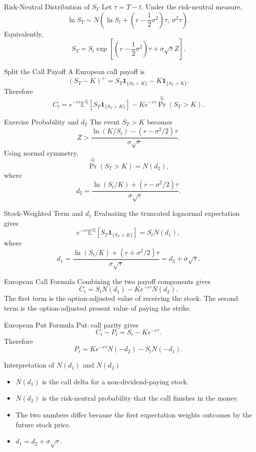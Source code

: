 \documentclass[aspectratio=169]{beamer}
\newcommand{\E}{\mathbb{E}}
\begin{document}
\begin{frame}[t]{Risk-Neutral Distribution of $S_T$}
\justifying
Let $\tau=T-t$. Under the risk-neutral measure,
\[\ln S_T\sim N\left(\ln S_t+\left(r-\frac12\sigma^2\right)\tau,\ \sigma^2\tau\right).\]
Equivalently,
\[S_T=S_t\exp\left[\left(r-\frac12\sigma^2\right)\tau+\sigma\sqrt\tau Z\right].\]
\end{frame}

\begin{frame}[t]{Split the Call Payoff}
\justifying
A European call payoff is
\[(S_T-K)^+=S_T\mathbf 1_{\{S_T>K\}}-K\mathbf 1_{\{S_T>K\}}.\]
Therefore
\[C_t=e^{-r\tau}\E^{\mathbb Q}[S_T\mathbf 1_{\{S_T>K\}}]-Ke^{-r\tau}\Pr^{\mathbb Q}(S_T>K).\]
\end{frame}

\begin{frame}[t]{Exercise Probability and $d_2$}
\justifying
The event $S_T>K$ becomes
\[Z>\frac{\ln(K/S_t)-(r-\sigma^2/2)\tau}{\sigma\sqrt\tau}.\]
Using normal symmetry,
\[\Pr^{\mathbb Q}(S_T>K)=N(d_2),\]
where
\[d_2=\frac{\ln(S_t/K)+(r-\sigma^2/2)\tau}{\sigma\sqrt\tau}.\]
\end{frame}

\begin{frame}[t]{Stock-Weighted Term and $d_1$}
\justifying
Evaluating the truncated lognormal expectation gives
\[e^{-r\tau}\E^{\mathbb Q}[S_T\mathbf 1_{\{S_T>K\}}]=S_tN(d_1),\]
where
\[d_1=\frac{\ln(S_t/K)+(r+\sigma^2/2)\tau}{\sigma\sqrt\tau}=d_2+\sigma\sqrt\tau.\]
\end{frame}

\begin{frame}[t]{European Call Formula}
\justifying
Combining the two payoff components gives
\[\boxed{C_t=S_tN(d_1)-Ke^{-r\tau}N(d_2)}.\]
The first term is the option-adjusted value of receiving the stock. The second term is the option-adjusted present value of paying the strike.
\end{frame}

\begin{frame}[t]{European Put Formula}
\justifying
Put--call parity gives
\[C_t-P_t=S_t-Ke^{-r\tau}.\]
Therefore
\[\boxed{P_t=Ke^{-r\tau}N(-d_2)-S_tN(-d_1)}.\]
\end{frame}

\begin{frame}[t]{Interpretation of $N(d_1)$ and $N(d_2)$}
\justifying
\begin{itemize}
\item $N(d_1)$ is the call delta for a non-dividend-paying stock.
\item $N(d_2)$ is the risk-neutral probability that the call finishes in the money.
\item The two numbers differ because the first expectation weights outcomes by the future stock price.
\item $d_1=d_2+\sigma\sqrt\tau$.
\end{itemize}
\end{frame}
\end{document}
